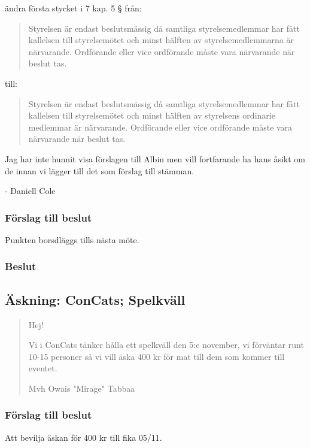 \documentclass[protokoll]{dvd}
\def\ordf{Daniell Cole}
\begin{document}
\begin{attsatser}
    \item 
    ändra första stycket i 7 kap. 5 § från:
    \begin{quote}
        Styrelsen är endast beslutsmässig då samtliga styrelsemedlemmar har fått kallelsen till styrelsemötet och minst hälften av styrelsemedlemmarna är närvarande.
        Ordförande eller vice ordförande måste vara närvarande när beslut tas.
    \end{quote}
    till:
    \begin{quote}
        Styrelsen är endast beslutsmässig då samtliga styrelsemedlemmar har fått kallelsen till styrelsemötet och minst hälften av styrelsens ordinarie medlemmar är närvarande.
        Ordförande eller vice ordförande måste vara närvarande när beslut tas.
    \end{quote}
\end{attsatser}

Jag har inte hunnit visa förslagen till Albin men vill fortfarande ha hans åsikt om de innan vi lägger till det som förslag till stämman. 

- \ordf
\subsubsection{Förslag till beslut}
\begin{attsatser}
    \item Punkten borsdläggs tills nästa möte. 
\end{attsatser}
\subsubsection{Beslut} 
\begin{attsatser}     
\item %
\end{attsatser}


\subsection{Äskning: ConCats; Spelkväll}
\begin{quote}
Hej!
    
Vi i ConCats tänker hålla ett spelkväll den 5:e november, vi förväntar runt 10-15 personer så vi vill äska 400 kr för mat till dem som kommer till eventet.
    
Mvh Owais "Mirage" Tabbaa
\end{quote}

\subsubsection*{Förslag till beslut}
\begin{attsatser}
    \item Att bevilja äskan för 400 kr till fika 05/11. 
\end{attsatser}
\end{document}
